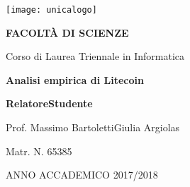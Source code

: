 \begin{spacing}{0.90}
\begin{center}
{\Large \thispagestyle{empty}}{\texttt{[image: unicalogo]}}\par
\end{center}
\end{spacing}

\noindent 
\begin{center}
\vspace{0.7cm}
\textbf{}\par
\end{center}{\LARGE \par}

\noindent 
\begin{center}
\textbf{\large FACOLT\`A DI SCIENZE}\par
\end{center}{\large \par}

\noindent
\begin{center}
{\large Corso di Laurea Triennale in Informatica}\par  %
\end{center}{\large \par}

\vspace{2.6cm}


\begin{center}
\textbf{\LARGE Analisi empirica di Litecoin}\par
\end{center}{\LARGE \par}

\begin{spacing}{0.90}
\vspace{3.7cm}
\textbf{\large Relatore}{\large \hfill{}}\textbf{\large Studente}{\large \par}
\end{spacing}

{\large Prof. Massimo Bartoletti\hfill{}Giulia Argiolas~}{\large \par}

\begin{spacing}{0.90}
{\large \hfill{}Matr. N. 65385}{\large \par}
\end{spacing}

\vspace{2.5cm}


\begin{center}
ANNO ACCADEMICO 2017/2018\par 
\end{center}